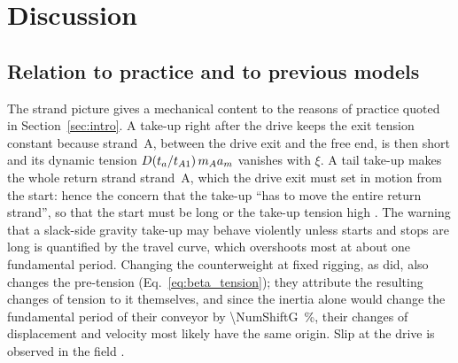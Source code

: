 \section{Discussion}\label{sec:discussion}

\subsection{Relation to practice and to previous models}\label{sec:relation}

The strand picture gives a mechanical content to the reasons of practice quoted in
Section~\ref{sec:intro}. A take-up right after the drive keeps the exit tension constant
\citep{lodewijks2013} because strand~A, between the drive exit and the free end, is then short
and its dynamic tension $D(t_a/t_{A1})\,m_Aa_m$ vanishes with $\xi$. A tail take-up makes the
whole return strand strand~A, which the drive exit must set in motion from the start: hence the
concern that the take-up ``has to move the entire return strand'', so that the start must be long
or the take-up tension high \citep{barfoot1997}. The warning that a slack-side gravity take-up
may behave violently unless starts and stops are long \citep{harrison1989} is quantified by the
travel curve, which overshoots most at about one fundamental period. Changing the counterweight
at fixed rigging, as \citet{gao2026} did, also changes the pre-tension
(Eq.~\eqref{eq:beta_tension}); they attribute the resulting changes of tension to it themselves,
and since the inertia alone would change the fundamental period of their conveyor by
\qty{\NumShiftG}{\percent}, their changes of displacement and velocity most likely have the same
origin. Slip at the drive is observed in the field \citep{kulinowski2013,kulinowski2021}.

